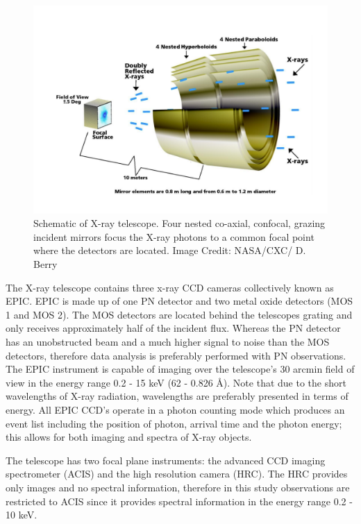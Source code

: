 \begin{figure}
    \centering
    \includegraphics[scale=0.45]{Figures/3-Xray_age/chandra_scheme.pdf}
    \caption{Schematic of \Chandra X-ray telescope. Four nested co-axial, confocal, grazing incident mirrors focus the X-ray photons to a common focal point where the detectors are located. Image Credit: NASA/CXC/ D. Berry}
    \label{fig:diagram_xray_telescope}
\end{figure}

The \XMM X-ray telescope \citep{Jansen_etal_2001} contains three x-ray CCD cameras collectively known as EPIC. EPIC is made up of one PN detector and two metal oxide detectors (MOS 1 and MOS 2). The MOS detectors are located behind the telescopes grating and only receives approximately half of the incident flux. Whereas the PN detector has an unobstructed beam and a much higher signal to noise than the MOS detectors, therefore data analysis is preferably performed with PN observations. The EPIC instrument is capable of imaging over the telescope's 30 arcmin field of view in the energy range 0.2 - 15 keV (62 - 0.826 \AA). Note that due to the short wavelengths of X-ray radiation, wavelengths are preferably presented in terms of energy. All EPIC CCD's operate in a photon counting mode which produces an event list including the position of photon, arrival time and the photon energy; this allows for both imaging and spectra of X-ray objects.

The \Chandra telescope \citep{Weisskopf_etal_2000} has two focal plane instruments: the advanced CCD imaging spectrometer (ACIS) and the high resolution camera (HRC). The HRC provides only images and no spectral information, therefore in this study observations are restricted to ACIS since it provides spectral information in the energy range 0.2 - 10 keV.

